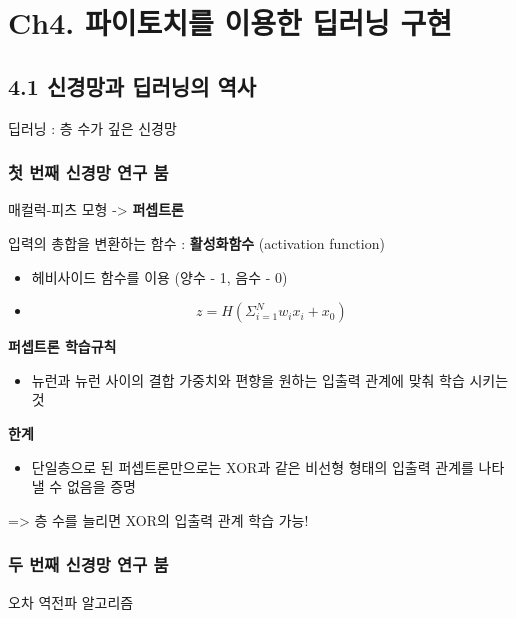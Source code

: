 \documentclass[]{article}
\date{}
\begin{document}
\hypertarget{header-n0}{%
\section{Ch4. 파이토치를 이용한 딥러닝 구현}\label{header-n0}}

\hypertarget{header-n2}{%
\subsection{4.1 신경망과 딥러닝의 역사}\label{header-n2}}

딥러닝 : 층 수가 깊은 신경망

\hypertarget{header-n4}{%
\subsubsection{첫 번째 신경망 연구 붐}\label{header-n4}}

매컬럭-피츠 모형 -\textgreater{} \textbf{퍼셉트론}

입력의 총합을 변환하는 함수 : \textbf{활성화함수} (activation function)

\begin{itemize}
\item
  헤비사이드 함수를 이용 (양수 - 1, 음수 - 0)
\item
  \[z=H(\Sigma_{i=1}^N w_ix_i+x_0)\]
\end{itemize}

\textbf{퍼셉트론 학습규칙}

\begin{itemize}
\item
  뉴런과 뉴런 사이의 결합 가중치와 편향을 원하는 입출력 관계에 맞춰 학습
  시키는 것 
\end{itemize}

\textbf{한계}

\begin{itemize}
\item
  단일층으로 된 퍼셉트론만으로는 XOR과 같은 비선형 형태의 입출력 관계를
  나타낼 수 없음을 증명
\end{itemize}

=\textgreater{} 층 수를 늘리면 XOR의 입출력 관계 학습 가능!

\hypertarget{header-n21}{%
\subsubsection{두 번째 신경망 연구 붐}\label{header-n21}}

오차 역전파 알고리즘
\end{document}
